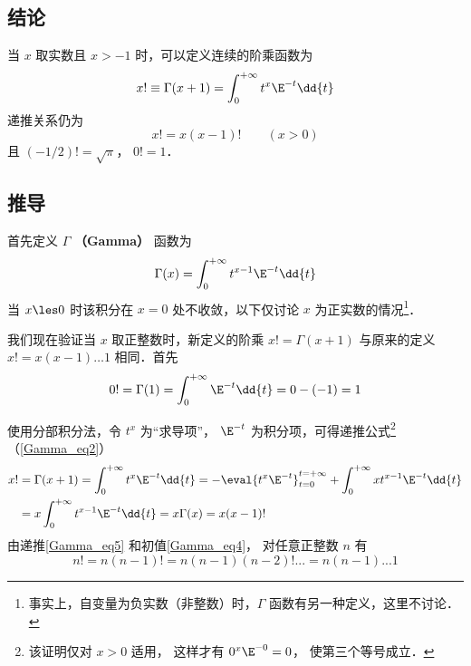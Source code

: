 

\subsection{结论}
当 $x$ 取实数且 $x>-1$ 时，可以定义连续的阶乘函数为
\begin{equation}
x! \equiv \Gamma (x + 1) = \int_0^{+\infty} t^x \E^{-t} \dd{t}
\end{equation}
递推关系仍为
\begin{equation}\label{Gamma_eq2}
x!=x(x-1)! \qquad (x>0)
\end{equation}
且 $(-1/2)!=\sqrt{\pi}$，  $0! = 1$．

\subsection{推导}

首先定义 $\Gamma$ \textbf{（Gamma）} 函数为
\begin{equation}
\Gamma(x) = \int_0^{+\infty} t^{x-1} \E^{-t} \dd{t}
\end{equation}
当 $x \les 0$ 时该积分在 $x=0$ 处不收敛，以下仅讨论 $x$ 为正实数的情况\footnote{事实上，自变量为负实数（非整数）时，$\Gamma$ 函数有另一种定义，这里不讨论．}．

我们现在验证当 $x$ 取正整数时，新定义的阶乘 $x! = \Gamma(x+1)$ 与原来的定义 $x! = x(x-1)\dots 1$ 相同．首先
\begin{equation}\label{Gamma_eq4}
0! = \Gamma(1) = \int_0^{+\infty} \E^{-t} \dd{t} = 0 - (-1) = 1
\end{equation}

使用分部积分法，令 $t^x$ 为“求导项”， $\E^{-t}$ 为积分项，可得递推公式\footnote{该证明仅对 $x>0$ 适用， 这样才有 $0^x \E^{-0} = 0$， 使第三个等号成立．}（\autoref{Gamma_eq2}）
\begin{equation}\label{Gamma_eq5}
\begin{aligned}
x! &= \Gamma(x+1) = \int_0^{+\infty} t^x \E^{-t} \dd{t} =  - \eval{t^x \E^{-t}}_{t=0}^{t=+\infty} + \int_0^{+\infty} x t^{x-1} \E^{-t} \dd{t} \\
&= x\int_0^{+\infty} t^{x-1} \E^{-t} \dd{t} = x\Gamma (x) = x(x-1)!
\end{aligned} \end{equation} 
由递推\autoref{Gamma_eq5} 和初值\autoref{Gamma_eq4}， 对任意正整数 $n$ 有
\begin{equation}
n! = n(n-1)! = n(n-1)(n-2)!... = n(n-1)...1
\end{equation}

